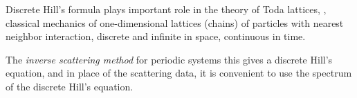 Discrete Hill's formula plays important role in the theory of Toda
lattices, \ie, classical mechanics of one-dimensional lattices
(chains) of particles with nearest neighbor interaction, discrete and
infinite in space, continuous in time.

The {\em inverse scattering method} for periodic systems this gives a
discrete Hill's equation, and in place of the scattering data, it is
convenient to use the spectrum of the discrete Hill's equation.
